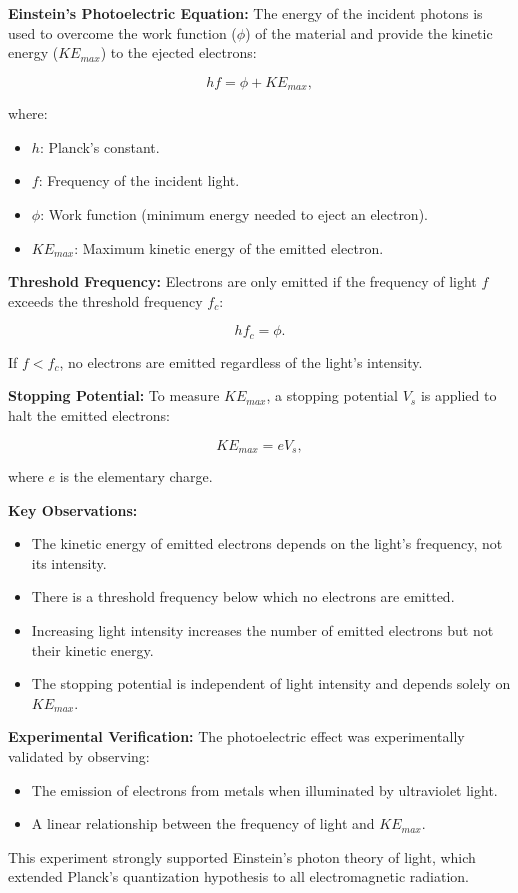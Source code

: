 \documentclass{article}
\newcommand{\eqbox}[1]{\begin{tcolorbox}[colback=gray!10] #1 \end{tcolorbox}}
\newcommand{\conceptbox}[1]{\begin{tcolorbox}[colback=blue!10] #1 \end{tcolorbox}}
\begin{document}
\conceptbox{
\textbf{Einstein's Photoelectric Equation:}
The energy of the incident photons is used to overcome the work function (\( \phi \)) of the material and provide the kinetic energy (\( KE_{max} \)) to the ejected electrons:
\eqbox{
\[
hf = \phi + KE_{max},
\]
}
where:
\begin{itemize}
    \item \( h \): Planck's constant.
    \item \( f \): Frequency of the incident light.
    \item \( \phi \): Work function (minimum energy needed to eject an electron).
    \item \( KE_{max} \): Maximum kinetic energy of the emitted electron.
\end{itemize}
}

\conceptbox{
\textbf{Threshold Frequency:}
Electrons are only emitted if the frequency of light \( f \) exceeds the threshold frequency \( f_c \):
\eqbox{
\[
hf_c = \phi.
\]
}
If \( f < f_c \), no electrons are emitted regardless of the light's intensity.
}

\conceptbox{
\textbf{Stopping Potential:}
To measure \( KE_{max} \), a stopping potential \( V_s \) is applied to halt the emitted electrons:
\eqbox{
\[
KE_{max} = eV_s,
\]
}
where \( e \) is the elementary charge.
}

\conceptbox{
\textbf{Key Observations:}
\begin{itemize}
    \item The kinetic energy of emitted electrons depends on the light's frequency, not its intensity.
    \item There is a threshold frequency below which no electrons are emitted.
    \item Increasing light intensity increases the number of emitted electrons but not their kinetic energy.
    \item The stopping potential is independent of light intensity and depends solely on \( KE_{max} \).
\end{itemize}
}

\conceptbox{
\textbf{Experimental Verification:}
The photoelectric effect was experimentally validated by observing:
\begin{itemize}
    \item The emission of electrons from metals when illuminated by ultraviolet light.
    \item A linear relationship between the frequency of light and \( KE_{max} \).
\end{itemize}
This experiment strongly supported Einstein's photon theory of light, which extended Planck's quantization hypothesis to all electromagnetic radiation.
}
\end{document}
